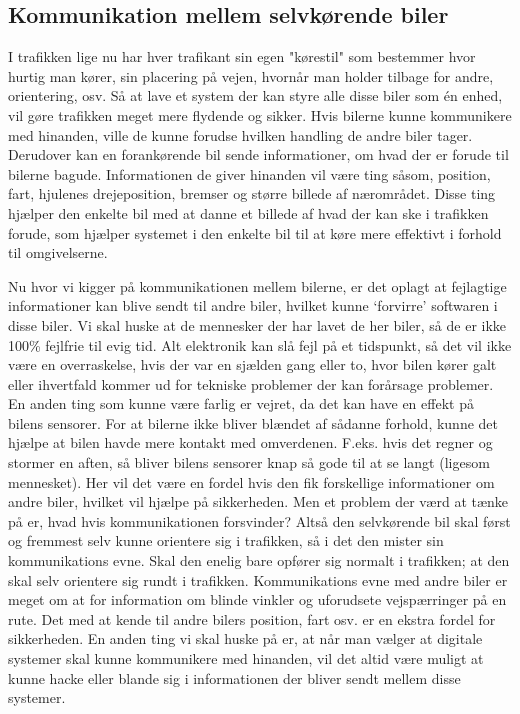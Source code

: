 
\subsection{Kommunikation mellem selvkørende biler}

I trafikken lige nu har hver trafikant sin egen "kørestil" som bestemmer hvor hurtig man kører, sin placering på vejen, hvornår man holder tilbage for andre, orientering, osv.  Så at lave et system der kan styre alle disse biler som \'en enhed, vil gøre trafikken meget mere flydende og sikker. Hvis bilerne kunne kommunikere med hinanden, ville de kunne forudse hvilken handling de andre biler tager. Derudover kan en forankørende bil sende informationer, om hvad der er forude til bilerne bagude. Informationen de giver hinanden vil være ting såsom, position, fart, hjulenes drejeposition, bremser og større billede af nærområdet. Disse ting hjælper den enkelte bil med at danne et billede af hvad der kan ske i trafikken forude, som hjælper systemet i den enkelte bil til at køre mere effektivt i forhold til omgivelserne. 

Nu hvor vi kigger på kommunikationen mellem bilerne, er det oplagt at fejlagtige informationer kan blive sendt til andre biler, hvilket kunne `forvirre' softwaren i disse biler. Vi skal huske at de mennesker der har lavet de her biler, så de er ikke 100\% fejlfrie til evig tid. Alt elektronik kan slå fejl på et tidspunkt, så det vil ikke være en overraskelse, hvis der var en sjælden gang eller to, hvor bilen kører galt eller ihvertfald kommer ud for tekniske problemer der kan forårsage problemer. En anden ting som kunne være farlig er vejret, da det kan have en effekt på bilens sensorer. For at bilerne ikke bliver blændet af sådanne forhold, kunne det hjælpe at bilen havde mere kontakt med omverdenen. F.eks. hvis det regner og stormer en aften, så bliver bilens sensorer knap så gode til at se langt (ligesom mennesket). Her vil det være en fordel hvis den fik forskellige informationer om andre biler, hvilket vil hjælpe på sikkerheden. Men et problem der værd at tænke på er, hvad hvis kommunikationen forsvinder? Altså den selvkørende bil skal først og fremmest selv kunne orientere sig i trafikken, så i det den mister sin kommunikations evne. Skal den enelig bare opfører sig normalt i trafikken; at den skal selv orientere sig rundt i trafikken. Kommunikations evne med andre biler er meget om at for information om blinde vinkler og uforudsete vejspærringer på en rute. Det med at kende til andre bilers position, fart osv. er en ekstra fordel for sikkerheden. En anden ting vi skal huske på er, at når man vælger at digitale systemer skal kunne kommunikere med hinanden, vil det altid være muligt at kunne hacke eller blande sig i informationen der bliver sendt mellem disse systemer. \cite{car_to_car}
